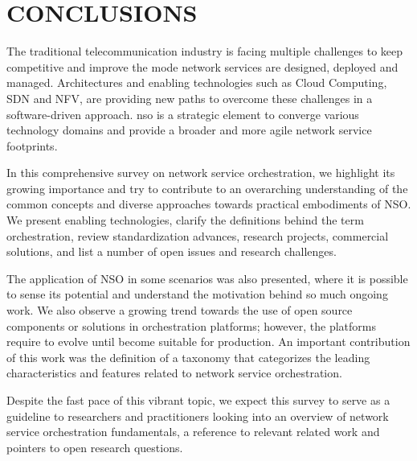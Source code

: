 \section{CONCLUSIONS}
\label{sec:Conclusion}

The traditional telecommunication industry is facing multiple challenges to keep competitive and improve the mode network services are designed, deployed and managed. Architectures and enabling technologies such as Cloud Computing, SDN and NFV, are providing new paths to overcome these challenges in a software-driven approach.  \acrfull{nso} is a strategic element to converge various technology domains and provide a broader and more agile network service footprints. 

In this comprehensive survey on network service orchestration, we highlight its growing importance and try to contribute to an overarching understanding of the common concepts and diverse approaches towards practical embodiments of NSO. We present enabling technologies, clarify the definitions behind the term orchestration, review standardization advances, research projects, commercial solutions, and list a number of open issues and research challenges. 

The application of NSO in some scenarios was also presented, where it is possible to sense its potential and understand the motivation behind so much ongoing work. We also observe a growing trend towards the use of open source components or solutions in orchestration platforms; however, the platforms require to evolve until become suitable for production. An important contribution of this work was the definition of a taxonomy that categorizes the leading characteristics and features related to network service orchestration.

Despite the fast pace of this vibrant topic, we expect this survey to serve as a guideline to researchers and practitioners looking into an overview of network service orchestration fundamentals, a reference to relevant related work and pointers to open research questions.